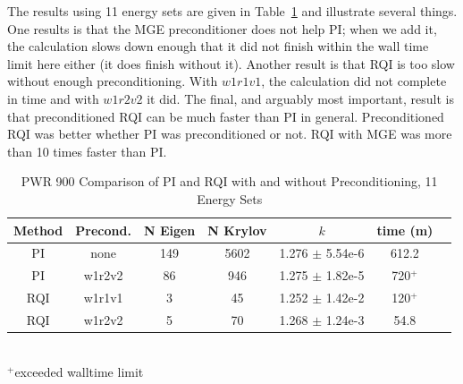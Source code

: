 \documentclass{article}                                                                           %
\begin{document}
The results using 11 energy sets are given in Table~\ref{tab:PWR all} and illustrate several things. One results is that the MGE preconditioner does not help PI; when we add it, the calculation slows down enough that it did not finish within the wall time limit here either (it does finish without it). Another result is that RQI is too slow without enough preconditioning. With $w1r1v1$, the calculation did not complete in time and with $w1r2v2$ it did. The final, and arguably most important, result is that preconditioned RQI can be much faster than PI in general. 
Preconditioned RQI was better whether PI was preconditioned or not. RQI with MGE was more than 10 times faster than PI. 
%
\begin{table}[!h]
\caption{PWR 900 Comparison of PI and RQI with and without Preconditioning, 11 Energy Sets}
\label{tab:PWR all}
  \begin{center}
    \begin{tabular}{| c | c | c | c | c | c | c |}
      \hline
      Method & Precond. & N Eigen & N Krylov & $k$ & time (m) \\\hline
      PI  & none   & 149 & 5602 & 1.276 $\pm$ 5.54e-6 & 612.2 \\
      PI  & w1r2v2 & 86  & 946  & 1.275 $\pm$ 1.82e-5 & 720$^+$ \\\hline
      RQI & w1r1v1 & 3   & 45   & 1.252 $\pm$ 1.42e-2 & 120$^+$ \\
      RQI & w1r2v2 & 5   & 70   & 1.268 $\pm$ 1.24e-3 & 54.8 \\
      \hline
    \end{tabular}\\
    $^{+}$exceeded walltime limit\\
  \end{center}
\end{table}
\end{document}
